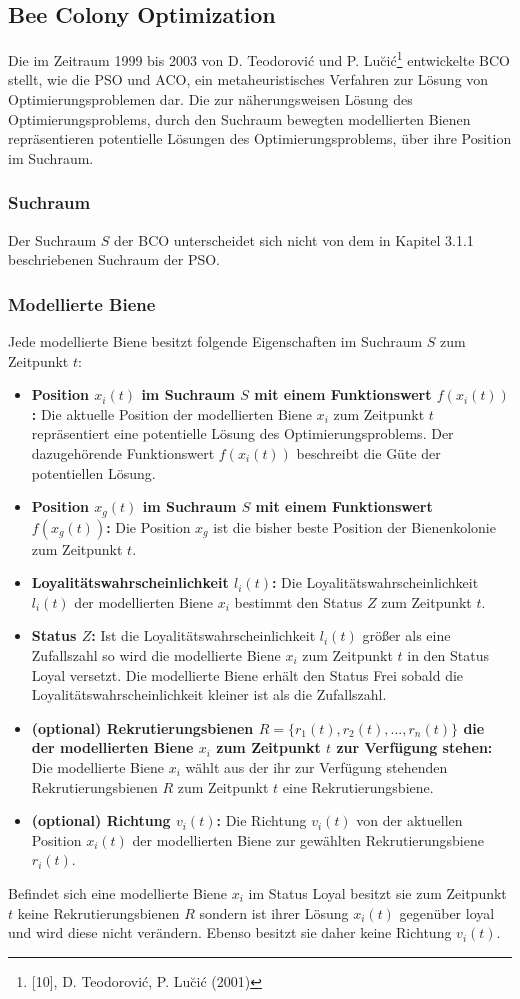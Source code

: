 \documentclass[a4paper, 11pt]{article}
\begin{document}
\subsection{Bee Colony Optimization}
Die im Zeitraum 1999 bis 2003 von D. Teodorovi\'{c} und P. Lu\u{c}i\'{c}\footnote{[10], D. Teodorovi\'{c}, P. Lu\u{c}i\'{c} (2001)} entwickelte \acs{BCO} stellt, wie die \acs{PSO} und \acs{ACO}, ein metaheuristisches Verfahren zur Lösung von Optimierungsproblemen dar. Die zur näherungsweisen Lösung des Optimierungsproblems, durch den Suchraum bewegten modellierten Bienen repräsentieren potentielle Lösungen des Optimierungsproblems, über ihre Position im Suchraum. 
\subsubsection{Suchraum}
Der Suchraum $S$ der \acs{BCO} unterscheidet sich nicht von dem in Kapitel 3.1.1 beschriebenen Suchraum der \acs{PSO}. 
\subsubsection{Modellierte Biene}
Jede modellierte Biene besitzt folgende Eigenschaften im Suchraum $S$ zum Zeitpunkt $t$:
\begin{itemize}
	\item \textbf{Position $x_{i}(t)$ im Suchraum $S$ mit einem Funktionswert $f(x_{i}(t))$:} Die aktuelle Position der modellierten Biene $x_{i}$ zum Zeitpunkt $t$ repräsentiert eine potentielle Lösung des Optimierungsproblems. Der dazugehörende Funktionswert $f(x_{i}(t))$ beschreibt die Güte der potentiellen Lösung.
	\item \textbf{Position $x_{g}(t)$ im Suchraum $S$ mit einem Funktionswert $f(x_{g}(t))$:} Die Position $x_{g}$ ist die bisher beste Position der Bienenkolonie zum Zeitpunkt $t$.
	\item \textbf{Loyalitätswahrscheinlichkeit $l_{i}(t)$:} Die Loyalitätswahrscheinlichkeit $l_{i}(t)$ der modellierten Biene $x_{i}$ bestimmt den Status $Z$ zum Zeitpunkt $t$.
	\item \textbf{Status $Z$:} Ist die Loyalitätswahrscheinlichkeit $l_{i}(t)$ größer als eine Zufallszahl so wird die modellierte Biene $x_{i}$ zum Zeitpunkt $t$ in den Status Loyal versetzt. Die modellierte Biene erhält den Status Frei sobald die Loyalitätswahrscheinlichkeit kleiner ist als die Zufallszahl.
	\item \textbf{(optional) Rekrutierungsbienen  $R=\{r_{1}(t),r_{2}(t),...,r_{n}(t)\}$ die der modellierten Biene $x_{i}$ zum Zeitpunkt $t$ zur Verfügung stehen:} Die modellierte Biene $x_{i}$ wählt aus der ihr zur Verfügung stehenden Rekrutierungsbienen $R$ zum Zeitpunkt $t$ eine Rekrutierungsbiene. 
	\item \textbf{(optional) Richtung $v_{i}(t)$:} Die Richtung $v_{i}(t)$ von der aktuellen Position $x_{i}(t)$ der modellierten Biene zur gewählten Rekrutierungsbiene $r_{i}(t)$.
\end{itemize}
Befindet sich eine modellierte Biene $x_{i}$ im Status Loyal besitzt sie zum Zeitpunkt $t$ keine Rekrutierungsbienen $R$ sondern ist ihrer Lösung $x_{i}(t)$ gegenüber loyal und wird diese nicht verändern. Ebenso besitzt sie daher keine Richtung $v_{i}(t)$.
\newpage
\end{document}
